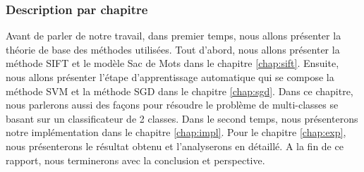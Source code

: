 \subsubsection{Description par chapitre}

Avant de parler de notre travail, dans premier temps, nous allons présenter la théorie de base des méthodes utilisées. Tout d'abord, nous allons présenter la méthode SIFT et le modèle Sac de Mots dans le chapitre \ref{chap:sift}. Ensuite, nous allons présenter l'étape d'apprentissage automatique qui se compose la méthode SVM et la méthode SGD dans le chapitre \ref{chap:sgd}. Dans ce chapitre, nous parlerons aussi des façons pour résoudre le problème de multi-classes se basant sur un classificateur de 2 classes. Dans le second temps, nous présenterons notre implémentation dans le chapitre \ref{chap:impl}. Pour le chapitre \ref{chap:exp}, nous présenterons le résultat obtenu et l'analyserons en détaillé. A la fin de ce rapport, nous terminerons avec la conclusion et perspective.